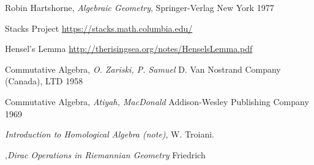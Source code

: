 \documentclass[12pt]{article}
\theoremstyle{plain}
\theoremstyle{definition}
\begin{document}
\begin{thebibliography}{9}
 Robin Hartshorne, \emph{Algebraic Geometry}, Springer-Verlag New York 1977

 Stacks Project \url{https://stacks.math.columbia.edu/}

 Hensel's Lemma \url{http://therisingsea.org/notes/HenselsLemma.pdf}

 Commutative Algebra, \emph{O. Zariski, P. Samuel} D. Van Nostrand Company (Canada), LTD 1958

 Commutative Algebra, \emph{Atiyah, MacDonald} Addison-Wesley Publishing Company 1969

 \emph{Introduction to Homological Algebra (note)}, W. Troiani.

,\emph{Dirac Operations in Riemannian Geometry} Friedrich

\end{thebibliography}
\end{document}
